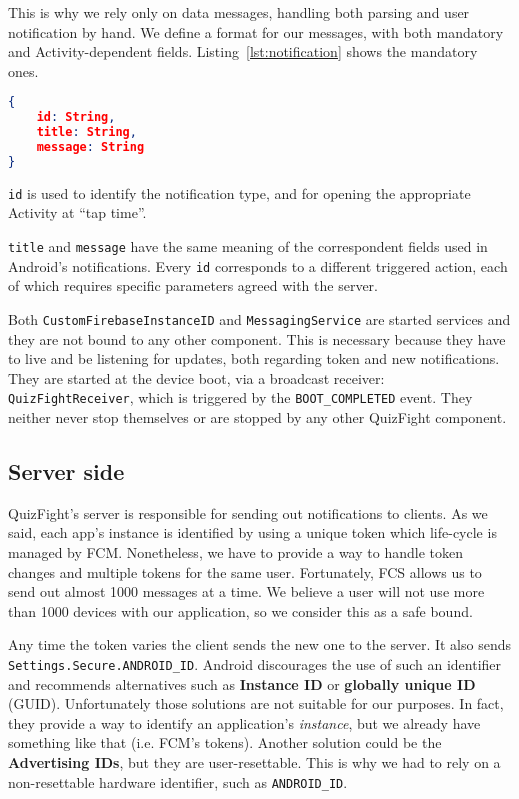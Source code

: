 This is why we rely only on data messages, handling both parsing and user
notification by hand.
We define a format for our messages, with both mandatory and Activity-dependent
fields. Listing~\ref{lst:notification} shows the mandatory ones.

\begin{lstlisting}[language=json, caption={Mandatory fields for a notification}, label={lst:notification}]
{
	id: String,
	title: String,
	message: String
}
\end{lstlisting}

\texttt{id} is used to identify the notification type, and for opening the
appropriate Activity at ``tap time''.

\texttt{title} and \texttt{message} have the same meaning of the correspondent
fields used in Android's notifications.
Every \texttt{id} corresponds to a different triggered action, each of which
requires specific parameters agreed with the server.

Both \texttt{CustomFirebaseInstanceID} and \texttt{MessagingService} are
started services and they are not bound to any other component.
This is necessary because they have to live and be listening for updates,
both regarding token and new notifications.
They are started at the device boot, via a broadcast receiver: 
\texttt{QuizFightReceiver}, which is triggered by the \texttt{BOOT\_COMPLETED}
event.
They neither never stop themselves or are stopped by any other QuizFight
component. 

\subsection{Server side}
QuizFight's server is responsible for sending out notifications to clients. As we said, each app's instance is identified by using a unique token which life-cycle is managed by FCM. Nonetheless, we have to provide a way to handle token changes and multiple tokens for the same user. Fortunately, FCS allows us to send out almost 1000 messages at a time. We believe a user will not use more than 1000 devices with our application, so we consider this as a safe bound.

Any time the token varies the client sends the new one to the server. It also sends \texttt{Settings.Secure.ANDROID\_ID}. Android discourages the use of such an identifier and recommends alternatives such as \textbf{Instance ID} or \textbf{globally unique ID} (GUID). Unfortunately those solutions are not suitable for our purposes. In fact, they provide a way to identify an application's \textit{instance}, but we already have something like that (i.e. FCM's tokens). Another solution could be the \textbf{Advertising IDs}, but they are user-resettable. This is why we had to rely on a non-resettable hardware identifier, such as \texttt{ANDROID\_ID}.

